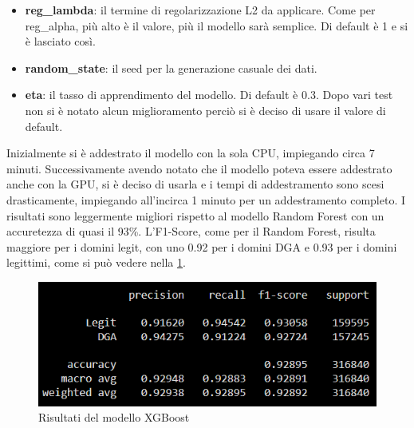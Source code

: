 \documentclass[12pt,a4paper,openright,twoside]{book}
\begin{document}
\begin{itemize}
    più alto è il valore, più il modello sarà semplice e meno suscettibile all'overfitting.
    Di default è 0 e si è deciso di usare 0.1.
    \item \textbf{reg\_lambda}: il termine di regolarizzazione L2 da applicare.
    Come per reg\_alpha, più alto è il valore, più il modello sarà semplice.
    Di default è 1 e si è lasciato così.
    \item \textbf{random\_state}: il seed per la generazione casuale dei dati.
    \item \textbf{eta}: il tasso di apprendimento del modello.
    Di default è 0.3. Dopo vari test
    non si è notato alcun miglioramento perciò 
    si è deciso di usare il valore di default.
\end{itemize}

Inizialmente si è addestrato il modello con la sola 
CPU, impiegando circa 7 minuti. 
Successivamente avendo notato che il modello
poteva essere addestrato anche con la GPU, si è deciso di usarla
e i tempi di addestramento sono scesi drasticamente,
impiegando all'incirca 1 minuto per un addestramento completo.
I risultati sono leggermente migliori rispetto al modello Random Forest
con un accuretezza di quasi il 93\%. L'F1-Score, come per il Random Forest,
risulta maggiore per i domini legit,
con uno 0.92 per i domini DGA e 0.93 per i domini legittimi,
come si può vedere nella \cref{fig:XGBoost results}.
\begin{figure}[H]
    \centering
    \includegraphics[width=.8\linewidth]{figures/XGBoost_results.png}
    \caption{Risultati del modello XGBoost}
    \label{fig:XGBoost results}
\end{figure}
\end{document}
